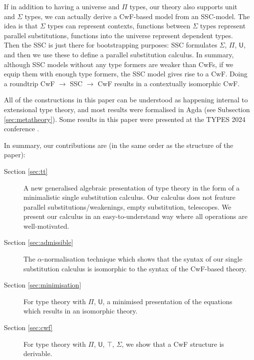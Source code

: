 \documentclass[submission,copyright,creativecommons]{eptcs}
\newcommand{\U}{\mathsf{U}}
\begin{document}
If in addition to having a universe and $\Pi$ types, our theory
also supports unit and $\Sigma$ types, we can actually derive a
CwF-based model from an SSC-model. The idea is that $\Sigma$ types can
represent contexts, functions between $\Sigma$ types represent
parallel substitutions, functions into the universe represent
dependent types. Then the SSC is just there for bootstrapping
purposes: SSC formulates $\Sigma$, $\Pi$, $\U$, and then we use these
to define a parallel substitution calculus. In summary, although SSC
models without any type formers are weaker than CwFs, if we equip them
with enough type formers, the SSC model gives rise to a CwF. Doing a
roundtrip CwF $\longrightarrow$ SSC $\longrightarrow$ CwF results in a
contextually isomorphic CwF.

All of the constructions in this paper can be understood as happening
internal to extensional type theory, and most results were formalised
in Agda (see Subsection \ref{sec:metatheory}). Some results in this
paper were presented at the TYPES 2024 conference \cite{singleTypes}.

In summary, our contributions are (in the same order as the structure of the paper):
\begin{description}
\item[Section \ref{sec:tt}] A new generalised algebraic presentation of type theory in the
  form of a minimalistic single substitution calculus. Our calculus
  does not feature parallel substitutions/weakenings, empty
  substitution, telescopes. We present our calculus in an
  easy-to-understand way where all operations are well-motivated.
\item[Section \ref{sec:admissible}] The $\alpha$-normalisation technique which shows that the syntax
  of our single substitution calculus is isomorphic to the syntax of
  the CwF-based theory.
\item[Section \ref{sec:minimisation}] For type theory with $\Pi$, $\U$, a minimised presentation of
  the equations which results in an isomorphic theory.
\item[Section \ref{sec:cwf}] For type theory with $\Pi$, $\U$, $\top$,
  $\Sigma$, we show that a CwF structure is derivable.
\end{description}
\end{document}
